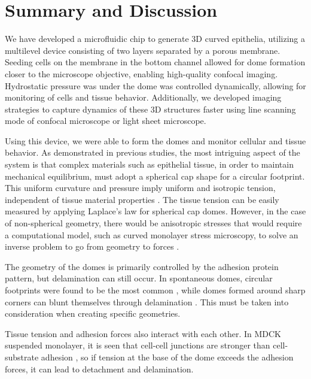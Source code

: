 \newpage

\hypertarget{summary-and-discussion}{%
\section{Summary and Discussion}\label{summary-and-discussion}}

We have developed a microfluidic chip to generate 3D curved epithelia, utilizing a multilevel device consisting of two layers separated by a porous membrane. Seeding cells on the membrane in the bottom channel allowed for dome formation closer to the microscope objective, enabling high-quality confocal imaging. Hydrostatic pressure was under the dome was controlled dynamically, allowing for monitoring of cells and tissue behavior. Additionally, we developed imaging strategies to capture dynamics of these 3D structures faster using line scanning mode of confocal microscope or light sheet microscope.

Using this device, we were able to form the domes and monitor cellular and tissue behavior. As demonstrated in previous studies, the most intriguing aspect of the system is that complex materials such as epithelial tissue, in order to maintain mechanical equilibrium, must adopt a spherical cap shape for a circular footprint. This uniform curvature and pressure imply uniform and isotropic tension, independent of tissue material properties \cite{latorre2018,marin-llaurado2022}. The tissue tension can be easily measured by applying Laplace's law for spherical cap domes. However, in the case of non-spherical geometry, there would be anisotropic stresses that would require a computational model, such as curved monolayer stress microscopy, to solve an inverse problem to go from geometry to forces \cite{marin-llaurado2022}.  

The geometry of the domes is primarily controlled by the adhesion protein pattern, but delamination can still occur. In spontaneous domes, circular footprints were found to be the most common  \cite{tanner1983}, while domes formed around sharp corners can blunt themselves through delamination \cite{latorre2018}. This must be taken into consideration when creating specific geometries.  

Tissue tension and adhesion forces also interact with each other. In MDCK suspended monolayer, it is seen that cell-cell junctions are stronger than cell-substrate adhesion \cite{harris2012}, so if tension at the base of the dome exceeds the adhesion forces, it can lead to detachment and delamination.  


